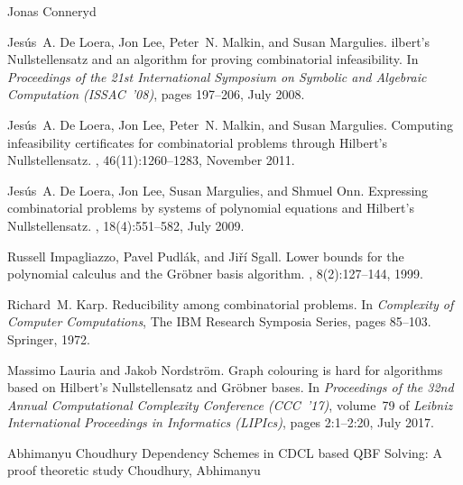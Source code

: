 \documentclass[report]{owrart}
\begin{document}
\begin{report}
\begin{talk}{Jonas Conneryd}
\begin{thebibliography}{99}
Jesús~A. {De Loera}, Jon Lee, Peter~N. Malkin, and Susan Margulies.
ilbert's {N}ullstellensatz and an algorithm for proving
  combinatorial infeasibility.
\newblock In {\em Proceedings of the 21st International Symposium on Symbolic
  and Algebraic Computation ({ISSAC}~'08)}, pages 197\nobreakdash--206, July
  2008.

Jesús~A. {De Loera}, Jon Lee, Peter~N. Malkin, and Susan Margulies.
\newblock Computing infeasibility certificates for combinatorial problems
  through {H}ilbert's {N}ullstellensatz.
, 46(11):1260\nobreakdash--1283,
  November 2011.

Jesús~A. {De Loera}, Jon Lee, Susan Margulies, and Shmuel Onn.
\newblock Expressing combinatorial problems by systems of polynomial equations
  and {H}ilbert's {N}ullstellensatz.
,
  18(4):551\nobreakdash--582, July 2009.

Russell Impagliazzo, Pavel Pudl{\'a}k, and Ji{\v{r}}{\'i} Sgall.
\newblock Lower bounds for the polynomial calculus and the {G}r{\"o}bner basis
  algorithm.
, 8(2):127\nobreakdash--144, 1999.

Richard~M. Karp.
\newblock Reducibility among combinatorial problems.
\newblock In {\em Complexity of Computer Computations}, The IBM Research
  Symposia Series, pages 85\nobreakdash--103. Springer, 1972.

Massimo Lauria and Jakob Nordström.
\newblock Graph colouring is hard for algorithms based on {H}ilbert's
  {N}ullstellensatz and {G}röbner bases.
\newblock In {\em Proceedings of the 32nd Annual Computational Complexity
  Conference ({CCC}~'17)}, volume~79 of {\em Leibniz International Proceedings
  in Informatics (LIPIcs)}, pages 2:1\nobreakdash--2:20, July 2017.

\end{thebibliography}
  
\end{talk}



\begin{talk}{Abhimanyu Choudhury}
  {Dependency Schemes in CDCL based QBF Solving: A proof theoretic study}
  {Choudhury, Abhimanyu}
  
  \noindent
  

\end{talk}
\end{report}
\end{document}
